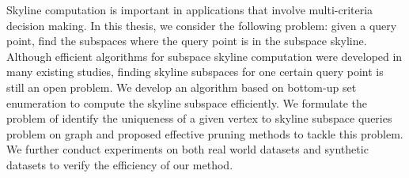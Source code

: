 
%
%


Skyline computation is important in applications that involve multi-criteria decision making. In this thesis, we consider the following problem: given a query point, find the subspaces where the query point is in the subspace skyline. Although efficient algorithms for subspace skyline computation were developed in many existing studies, finding skyline subspaces for one certain query point is still an open problem. We develop an algorithm based on bottom-up set enumeration to compute the skyline subspace efficiently. We formulate the problem of identify the uniqueness of a given vertex to skyline subspace queries problem on graph and proposed effective pruning methods to tackle this problem. We further conduct experiments on both real world datasets and synthetic datasets to verify the efficiency of our method.
